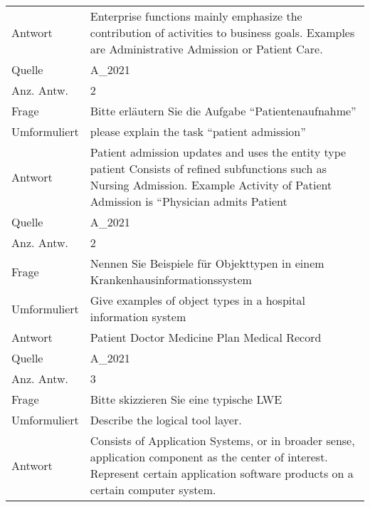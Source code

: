 \begin{landscape}
\begin{longtable}{p{3cm}p{}}
    Antwort & Enterprise functions mainly emphasize the contribution of activities to business goals.
    Examples are Administrative Admission or Patient Care.\\
    Quelle & A\_2021 \\
    Anz. Antw. & 2 \\
    \midrule
    Frage & Bitte erläutern Sie die Aufgabe ``Patientenaufnahme'' \\
    Umformuliert & please explain the task ``patient admission'' \\
    Antwort & Patient admission updates and uses the entity type patient
    Consists of refined subfunctions such as Nursing Admission.
    Example Activity of Patient Admission is ``Physician admits Patient \\
    Quelle & A\_2021 \\
    Anz. Antw. & 2 \\
    \midrule
    Frage & Nennen Sie Beispiele für Objekttypen in einem Krankenhausinformationssystem \\
    Umformuliert & Give examples of object types in a hospital information system \\
    Antwort & Patient
    Doctor
    Medicine Plan
    Medical Record \\
    Quelle & A\_2021 \\
    Anz. Antw. & 3 \\
    \midrule
    Frage & Bitte skizzieren Sie eine typische LWE \\
    Umformuliert & Describe the logical tool layer.\\
    Antwort & Consists of Application Systems, or in broader sense, application component as the center of interest.
    Represent certain application software products on a certain computer system.


\end{longtable}
\end{landscape}
